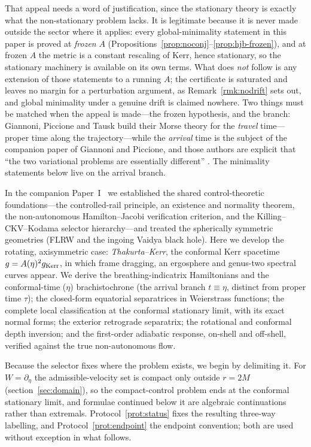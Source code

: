 \documentclass[12pt]{iopart}
\theoremstyle{plain}
\theoremstyle{definition}
\theoremstyle{remark}
\begin{document}
That appeal needs a word of justification, since the stationary theory is exactly
what the non-stationary problem lacks. It is legitimate because it is never made
outside the sector where it applies: every global-minimality statement in this paper
is proved at \emph{frozen} $A$ (Propositions~\ref{prop:noconj}--\ref{prop:hjb-frozen}),
and at frozen $A$ the metric is a constant rescaling of Kerr, hence stationary, so
the stationary machinery is available on its own terms. What does \emph{not} follow
is any extension of those statements to a running $A$; the certificate is saturated
and leaves no margin for a perturbation argument, as Remark~\ref{rmk:nodrift} sets
out, and global minimality under a genuine drift is claimed nowhere. Two things must
be matched when the appeal is made---the frozen hypothesis, and the branch: Giannoni, Piccione and Tausk build their Morse theory for the \emph{travel}
time---proper time along the trajectory---while the \emph{arrival} time is the
subject of the companion paper of Giannoni and Piccione, and those authors are
explicit that ``the two variational problems are essentially different''
\cite[\S1]{GiannoniPiccioneTausk2002}. The minimality statements below live on the
arrival branch.

In the
companion Paper~I~\cite{PaperOne} we established the shared control-theoretic
foundations---the
controlled-rail principle, an existence and normality theorem, the non-autonomous
Hamilton--Jacobi verification criterion, and the Killing--CKV--Kodama selector
hierarchy---and treated the spherically symmetric geometries (FLRW and the ingoing Vaidya
black hole). Here we develop the rotating, axisymmetric case: \emph{Thakurta--Kerr}, the
conformal Kerr spacetime $g=A(\eta)^2 g_{\rm Kerr}$, in which frame dragging, an
ergosphere and genus-two spectral curves appear. We derive the breathing-indicatrix
Hamiltonians and the conformal-time ($\eta$) brachistochrone (the arrival branch
$t\equiv\eta$, distinct from proper time $\tau$); the closed-form equatorial separatrices
in Weierstrass functions; the complete local classification at the conformal stationary
limit, with its exact normal forms; the exterior retrograde separatrix; the rotational and
conformal depth inversion; and the first-order adiabatic response, on-shell and
off-shell, verified against the true non-autonomous flow.

Because the selector fixes where the problem exists, we begin by delimiting it. For
$W=\partial_\eta$ the admissible-velocity set is compact only outside $r=2M$
(section~\ref{sec:domain}), so the compact-control problem ends at the conformal
stationary limit, and formulae continued below it are algebraic continuations rather than
extremals. Protocol~\ref{prot:status} fixes the resulting three-way labelling, and
Protocol~\ref{prot:endpoint} the endpoint convention; both are used without exception in
what follows.
\end{document}
